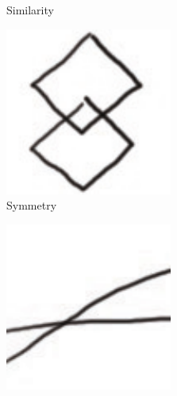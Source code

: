 \begin{figure}
\begin{subfigure}[b]{28mm}
    \caption{Similarity}
    \label{fig:gestalt-similarity}
  \end{subfigure}
  \hspace{2mm}
  \begin{subfigure}[b]{28mm} 
    \includegraphics[width=\textwidth]{img/gestalt-symmetry.pdf} 
    \caption{Symmetry}
    \label{fig:gestalt-symmetry}
  \end{subfigure}
  \hspace{2mm}
  \begin{subfigure}[b]{28mm} 
    \includegraphics[width=\textwidth]{img/gestalt-continuation.pdf} 

\end{subfigure}
\end{figure}
